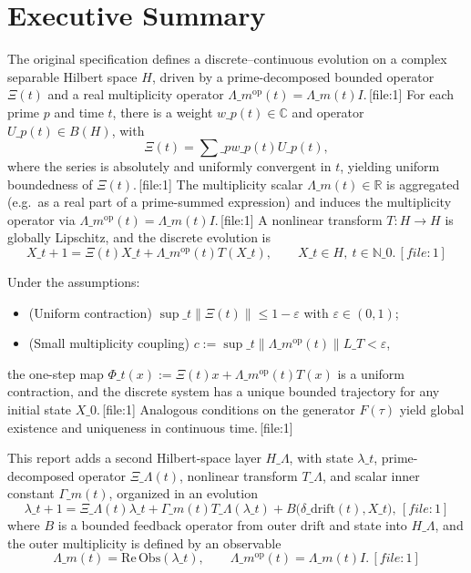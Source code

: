 \documentclass[11pt]{article}
\begin{document}
\section{Executive Summary}

The original specification defines a discrete--continuous evolution on a complex separable Hilbert space $H$, driven by a prime-decomposed bounded operator $\Xi(t)$ and a real multiplicity operator $\Lambda\_m^{\mathrm{op}}(t) = \Lambda\_m(t)I$.\,[file:1] For each prime $p$ and time $t$, there is a weight $w\_p(t)\in\mathbb{C}$ and operator $U\_p(t)\in B(H)$, with
\[
\Xi(t) = \sum\_p w\_p(t)U\_p(t),
\]
where the series is absolutely and uniformly convergent in $t$, yielding uniform boundedness of $\Xi(t)$.\,[file:1] The multiplicity scalar $\Lambda\_m(t)\in\mathbb{R}$ is aggregated (e.g.\ as a real part of a prime-summed expression) and induces the multiplicity operator via $\Lambda\_m^{\mathrm{op}}(t) = \Lambda\_m(t)I$.\,[file:1] A nonlinear transform $T:H\to H$ is globally Lipschitz, and the discrete evolution is
\[
X\_{t+1} = \Xi(t) X\_t + \Lambda\_m^{\mathrm{op}}(t) T(X\_t), \qquad X\_t\in H,\ t\in\mathbb{N}\_0.\,[file:1]
\]

Under the assumptions:
\begin{itemize}[nosep]
  \item (Uniform contraction) $\sup\_t\|\Xi(t)\|\le 1-\varepsilon$ with $\varepsilon\in(0,1)$; 
  \item (Small multiplicity coupling) $c := \sup\_t \|\Lambda\_m^{\mathrm{op}}(t)\| L\_T < \varepsilon$,
\end{itemize}
the one-step map $\Phi\_t(x):=\Xi(t)x + \Lambda\_m^{\mathrm{op}}(t)T(x)$ is a uniform contraction, and the discrete system has a unique bounded trajectory for any initial state $X\_0$.\,[file:1] Analogous conditions on the generator $F(\tau)$ yield global existence and uniqueness in continuous time.\,[file:1]

This report adds a second Hilbert-space layer $H\_\Lambda$, with state $\lambda\_t$, prime-decomposed operator $\Xi\_\Lambda(t)$, nonlinear transform $T\_\Lambda$, and scalar inner constant $\Gamma\_m(t)$, organized in an evolution
\[
\lambda\_{t+1} = \Xi\_\Lambda(t)\lambda\_t + \Gamma\_m(t) T\_\Lambda(\lambda\_t) + B\bigl(\delta\_{\mathrm{drift}}(t), X\_t\bigr),\,[file:1]
\]
where $B$ is a bounded feedback operator from outer drift and state into $H\_\Lambda$, and the outer multiplicity is defined by an observable
\[
\Lambda\_m(t) = \mathrm{Re}\,\mathrm{Obs}(\lambda\_t), \qquad \Lambda\_m^{\mathrm{op}}(t) = \Lambda\_m(t)I.\,[file:1]
\]
\end{document}
